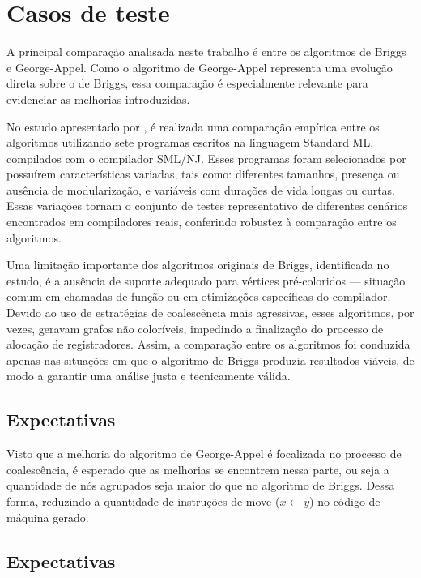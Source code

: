 \section{Casos de teste}

A principal comparação analisada neste trabalho é entre os algoritmos de Briggs e George-Appel.
Como o algoritmo de George-Appel representa uma evolução direta sobre o de Briggs, essa comparação é
especialmente relevante para evidenciar as melhorias introduzidas.

No estudo apresentado por \textcite{irc}, é realizada uma comparação empírica entre os algoritmos utilizando sete programas escritos na
linguagem Standard ML, compilados com o compilador SML/NJ. Esses programas foram selecionados por possuírem características variadas,
tais como: diferentes tamanhos, presença ou ausência de modularização, e variáveis com durações de vida longas ou curtas.
Essas variações tornam o conjunto de testes representativo de diferentes cenários encontrados em compiladores reais, conferindo robustez
à comparação entre os algoritmos.

Uma limitação importante dos algoritmos originais de Briggs, identificada no estudo, é a ausência de suporte adequado para vértices
pré-coloridos — situação comum em chamadas de função ou em otimizações específicas do compilador. Devido ao uso de estratégias de coalescência
mais agressivas, esses algoritmos, por vezes, geravam grafos não coloríveis, impedindo a finalização do processo de alocação de registradores.
Assim, a comparação entre os algoritmos foi conduzida apenas nas situações em que o algoritmo de Briggs produzia resultados viáveis, de modo
a garantir uma análise justa e tecnicamente válida.

\subsection{Expectativas}

Visto que a melhoria do algoritmo de George-Appel é focalizada no processo de coalescência, é esperado que as melhorias se encontrem nessa parte, ou seja
a quantidade de nós agrupados seja maior do que no algoritmo de Briggs. Dessa forma, reduzindo a quantidade de instruções de move 
($x \leftarrow y$) no código de máquina gerado.

\subsection{Expectativas}

